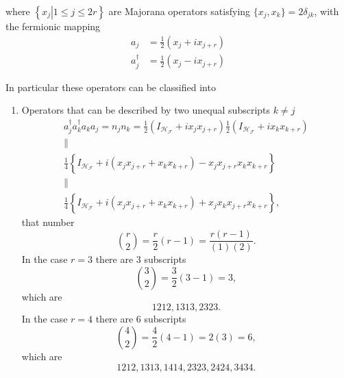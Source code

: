 \documentclass[aps,preprint]{revtex4}%
\begin{document}
where $\left\{  \left.  x_{j}\right\vert 1\leq j\leq2r\right\}  $ are Majorana
operators satisfying $\{x_{j},x_{k}\}=2\delta_{jk}$, with the fermionic
mapping
\begin{align*}
a_{j}  &  =\tfrac{1}{2}(x_{j}+ix_{j+r})\\
a_{j}^{\dagger}  &  =\tfrac{1}{2}(x_{j}-ix_{j+r})
\end{align*}


In particular these operators can be classified into

\begin{enumerate}
\item Operators that can be described by two unequal subscripts $k\neq j$
\begin{gather*}
a_{j}^{\dagger}a_{k}^{\dagger}a_{k}a_{j}=n_{j}n_{k}=\frac{1}{2}\left(
I_{\mathcal{H}_{\mathcal{F}}}+ix_{j}x_{j+r}\right)  \frac{1}{2}\left(
I_{\mathcal{H}_{\mathcal{F}}}+ix_{k}x_{k+r}\right) \\
\parallel\\
\frac{1}{4}\left\{  \overset{}{I_{\mathcal{H}_{\mathcal{F}}}+i\left(
x_{j}x_{j+r}+x_{k}x_{k+r}\right)  -x_{j}x_{j+r}x_{k}x_{k+r}}\right\} \\
\parallel\\
\frac{1}{4}\left\{  \overset{}{I_{\mathcal{H}_{\mathcal{F}}}+i\left(
x_{j}x_{j+r}+x_{k}x_{k+r}\right)  +x_{j}x_{k}x_{j+r}x_{k+r}}\right\}  ,
\end{gather*}
that number
\begin{equation}
\binom{r}{2}=\frac{r}{2}\left(  r-1\right)  =\frac{r\left(  r-1\right)
}{\left(  1\right)  \left(  2\right)  }.
\end{equation}
In the case $r=3$ there are $3$ subscripts
\begin{equation}
\binom{3}{2}=\frac{3}{2}\left(  3-1\right)  =3,
\end{equation}
which are
\begin{equation}
1212,1313,2323.
\end{equation}
In the case $r=4$ there are $6$ subscripts
\begin{equation}
\binom{4}{2}=\frac{4}{2}\left(  4-1\right)  =2\left(  3\right)  =6,
\end{equation}
which are
\begin{equation}
1212,1313,1414,2323,2424,3434.
\end{equation}



\end{enumerate}
\end{document}

